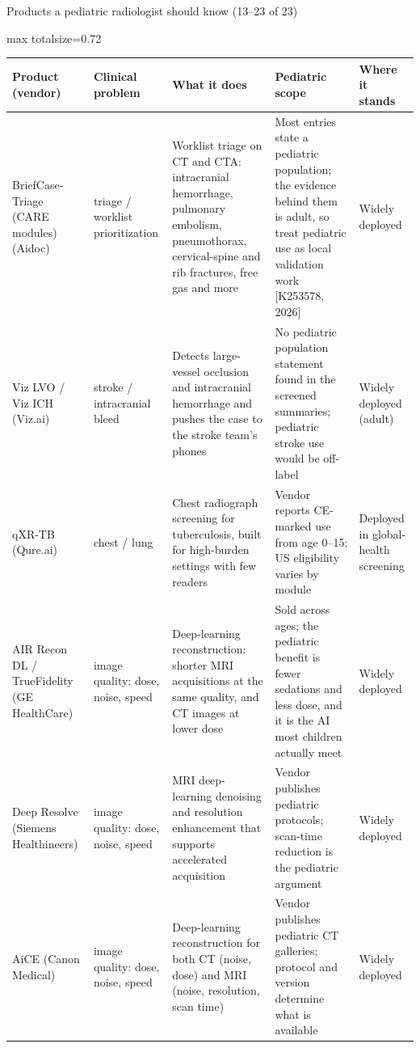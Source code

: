\documentclass[aspectratio=169]{beamer}
\renewcommand{\arraystretch}{1.08}
\begin{document}
\begin{frame}[category=Commercial Software]{Products a pediatric radiologist should know (13--23 of 23)}
\tiny
\begin{adjustbox}{max totalsize={\textwidth}{0.72\textheight}}
\renewcommand{\arraystretch}{1.2}
\begin{tabular}{|>{\raggedright\arraybackslash}p{}|>{\raggedright\arraybackslash}p{}|>{\raggedright\arraybackslash}p{}|>{\raggedright\arraybackslash}p{}|>{\raggedright\arraybackslash}p{}|}
\hline \textbf{Product (vendor)} & \textbf{Clinical problem} & \textbf{What it does} & \textbf{Pediatric scope} & \textbf{Where it stands} \\ \hline
BriefCase-Triage (CARE modules) (Aidoc) & triage / worklist prioritization & Worklist triage on CT and CTA: intracranial hemorrhage, pulmonary embolism, pneumothorax, cervical-spine and rib fractures, free gas and more & Most entries state a pediatric population; the evidence behind them is adult, so treat pediatric use as local validation work [K253578, 2026] & Widely deployed \\ \hline
Viz LVO / Viz ICH (Viz.ai) & stroke / intracranial bleed & Detects large-vessel occlusion and intracranial hemorrhage and pushes the case to the stroke team's phones & No pediatric population statement found in the screened summaries; pediatric stroke use would be off-label & Widely deployed (adult) \\ \hline
qXR-TB (Qure.ai) & chest / lung & Chest radiograph screening for tuberculosis, built for high-burden settings with few readers & Vendor reports CE-marked use from age 0--15; US eligibility varies by module & Deployed in global-health screening \\ \hline
AIR Recon DL / TrueFidelity (GE HealthCare) & image quality: dose, noise, speed & Deep-learning reconstruction: shorter MRI acquisitions at the same quality, and CT images at lower dose & Sold across ages; the pediatric benefit is fewer sedations and less dose, and it is the AI most children actually meet & Widely deployed \\ \hline
Deep Resolve (Siemens Healthineers) & image quality: dose, noise, speed & MRI deep-learning denoising and resolution enhancement that supports accelerated acquisition & Vendor publishes pediatric protocols; scan-time reduction is the pediatric argument & Widely deployed \\ \hline
AiCE (Canon Medical) & image quality: dose, noise, speed & Deep-learning reconstruction for both CT (noise, dose) and MRI (noise, resolution, scan time) & Vendor publishes pediatric CT galleries; protocol and version determine what is available & Widely deployed \\ \hline

\end{tabular}
\end{adjustbox}
\end{frame}
\end{document}
